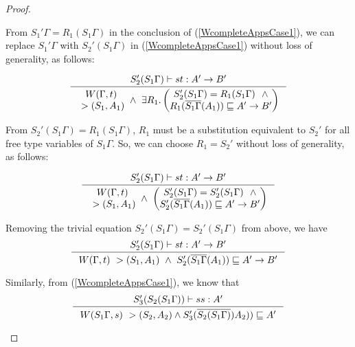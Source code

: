 \begin{proof}
\begin{itemize}
	From $S_1'\Gamma = R_1(S_1\Gamma)$ in the conclusion of 
	(\ref{WcompleteAppsCase1}), we can replace $S_1'\Gamma$
	with $S_2'(S_1\Gamma)$ in (\ref{WcompleteAppsCase1})
	without loss of generality, as follows: \vspace*{-2em}
	\begin{singlespace}
	\begin{align*}
	\inference{S_2'(S_1\Gamma) |-s t : A' -> B'}{
	\begin{matrix} W(\Gamma,t)  \\~> (S_1,A_1) \end{matrix}
	~\land~ \exists R_1.
	\left(\begin{matrix}
		S_2'(S_1\Gamma)=R_1(S_1\Gamma) ~~\land\\
		R_1(\overline{S_1\Gamma}(A_1))
		\sqsubseteq A' -> B'
	\end{matrix}\right) }
	\end{align*}
	\end{singlespace}
	From $S_2'(S_1\Gamma)=R_1(S_1\Gamma)$, $R_1$ must be a substitution
	equivalent to $S_2'$ for all free type variables of $S_1\Gamma$.
	So, we can choose $R_1=S_2'$ without loss of generality, as follows:
	\vspace*{-2em}
	\begin{singlespace}
	\begin{align*}
	\inference{S_2'(S_1\Gamma) |-s t : A' -> B'}{
	\begin{matrix} W(\Gamma,t)  \\~> (S_1,A_1) \end{matrix}
	~\land~
	\left(\begin{matrix}
		S_2'(S_1\Gamma)=S_2'(S_1\Gamma) ~~\land\\
		S_2'(\overline{S_1\Gamma}(A_1))
		\sqsubseteq A' -> B'
	\end{matrix}\right) }
	\end{align*}
	\end{singlespace}
	Removing the trivial equation $S_2'(S_1\Gamma)=S_2'(S_1\Gamma)$
	from above, we have
	\begin{equation}
	\inference{ S_2'(S_1\Gamma) |-s t : A' -> B' }{
	W(\Gamma,t) ~> (S_1,A_1) ~\land~
	S_2'(\overline{S_1\Gamma}(A_1)) \sqsubseteq A' -> B' }
	\label{WcompleteAppsCase1'}
	\end{equation}

	Similarly, from (\ref{WcompleteAppsCase1}), we know that
	\begin{equation}
	\inference{ S_3'(S_2(S_1\Gamma)) |-s s : A'}{
		W(S_1\Gamma,s) ~> (S_2,A_2) \land
		S_3'(\overline{S_2(S_1\Gamma)})A_2))\sqsubseteq A' }
	\label{WcompleteAppsCase2'}
	\end{equation}


\end{itemize}
\end{proof}

